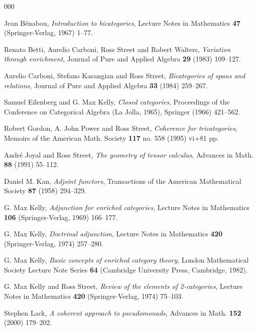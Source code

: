 \documentclass[a4paper,10pt]{article}
\numberwithin{equation}{section}
\begin{document}
\appendix
\begin{thebibliography}{000}

 Jean B\'enabou, \textit{Introduction to bicategories}, Lecture Notes in Mathematics \textbf{47} (Springer-Verlag, 1967) 1--77.\label{Ben1967}

 Renato Betti, Aurelio Carboni, Ross Street and Robert Walters, \textit{Variation through enrichment}, Journal of Pure and Applied Algebra \textbf{29} (1983) 109--127.\label{BCSW}

 Aurelio Carboni, Stefano Kasangian and Ross Street, \textit{Bicategories of spans and relations}, Journal of Pure and Applied Algebra \textbf{33} (1984) 259--267.\label{CKS}

 Samuel Eilenberg and G. Max Kelly, \textit{Closed categories}, Proceedings of the Conference on Categorical Algebra (La Jolla, 1965), Springer (1966) 421--562.\label{EilKel1966}

 Robert Gordon, A. John Power and Ross Street, \textit {Coherence for tricategories},
Memoirs of the American Math. Society \textbf{117} no. 558 (1995) vi+81 pp.\label{GPS}

 Andr\'e Joyal and Ross Street, \textit{The geometry of tensor calculus}, Advances in Math. \textbf{88} (1991) 55--112.\label{GTC}

 Daniel M. Kan, \textit{Adjoint functors}, Transactions of the American Mathematical Society \textbf{87} (1958) 294--329. \label{Kan1958}

 G. Max Kelly, \textit{Adjunction for enriched categories}, Lecture Notes in Mathematics \textbf{106} (Springer-Verlag, 1969) 166--177.\label{Kelly1969}

 G. Max Kelly, \textit{Doctrinal adjunction}, Lecture Notes in Mathematics \textbf{420} (Springer-Verlag, 1974) 257--280.\label{Kelly1974}

 G. Max Kelly, \textit{Basic concepts of enriched category theory}, London Mathematical Society Lecture Note Series \textbf{64} (Cambridge University Press, Cambridge, 1982). \label{KellyBook}

 G. Max Kelly and Ross Street, \textit{Review of the elements of 2-categories}, Lecture Notes in Mathematics \textbf{420} (Springer-Verlag, 1974) 75--103.\label{KelSt1974}

 Stephen Lack, \textit{A coherent approach to pseudomonads}, Advances in Math. \textbf{152} (2000) 179--202.\label{Lack2000} 


\end{thebibliography}
\end{document}
